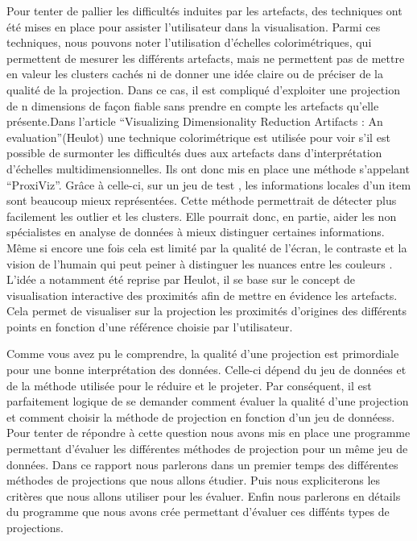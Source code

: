 \smallskip
Pour tenter de pallier les difficultés induites par les artefacts, des techniques ont été mises en place pour assister l’utilisateur dans la visualisation. Parmi ces techniques, nous pouvons noter l’utilisation d’échelles colorimétriques\cite{CheckViz}, qui permettent de mesurer les différents artefacts, mais ne permettent pas de mettre en valeur les clusters cachés ni de donner une idée claire ou de préciser de la qualité de la projection. 
Dans ce cas, il est compliqué d’exploiter une projection de n dimensions de façon fiable sans prendre en compte les artefacts qu’elle présente\cite{aupetit2007visualizing}.Dans l’article “Visualizing Dimensionality Reduction Artifacts : An evaluation”(Heulot) 
une technique colorimétrique est utilisée pour voir s’il est possible de surmonter les difficultés dues aux artefacts dans d’interprétation d’échelles multidimensionnelles. Ils ont donc mis en place une méthode s'appelant “ProxiViz”. Grâce à celle-ci, sur un jeu de test , les informations locales d’un item sont beaucoup mieux représentées. Cette méthode permettrait de détecter plus facilement les outlier et les clusters. 
Elle pourrait donc, en partie, aider les non spécialistes en analyse de données à mieux distinguer certaines informations. Même si encore une fois cela est limité par la qualité de l’écran, le contraste et la vision de l'humain qui peut peiner à distinguer les nuances entre les couleurs\cite{HeulotAnEvaluation} \cite{tran2021approaching} \cite{deering1998human_vision}.
L’idée a notamment été reprise par Heulot\cite{HeulotThese}, il se base sur le concept de visualisation interactive des proximités afin de mettre en évidence les artefacts. Cela permet de visualiser sur la projection les proximités d’origines des différents points en fonction d’une référence choisie par l’utilisateur.

\medskip
Comme vous avez pu le comprendre, la qualité d'une projection est primordiale pour une bonne interprétation des données. Celle-ci dépend du jeu de données et de la méthode utilisée pour le réduire et le projeter.
Par conséquent, il est parfaitement logique de se demander comment évaluer la qualité d'une projection et comment choisir la méthode de projection en fonction d'un jeu de donnéess.
Pour tenter de répondre à cette question nous avons mis en place une programme permettant d'évaluer les différentes méthodes de projection pour un même jeu de données.
Dans ce rapport nous parlerons dans un premier temps des différentes méthodes de projections que nous allons étudier. Puis nous expliciterons les critères que nous allons utiliser pour les évaluer.
Enfin nous parlerons en détails du programme que nous avons crée permettant d'évaluer ces diffénts types de projections.



        







